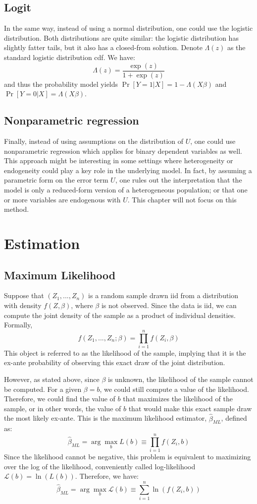 \documentclass[12pt]{report}
\newcommand{\Prob}[1]{\operatorname{Pr}\left[#1\right]}
\begin{document}
\subsection{Logit}

In the same way, instead of using a normal distribution, one could use the logistic distribution. Both distributions are quite similar: the logistic distribution has slightly fatter tails, but it also has a closed-from solution. Denote $\Lambda(z)$ as the standard logistic distribution cdf. We have: $$\Lambda(z) = \frac{\exp(z)}{1 + \exp(z)}$$ and thus the probability model yields $\Prob{Y = 1\vert X} = 1 - \Lambda(X\beta)$ and $\Prob{Y = 0\vert X} = \Lambda(X\beta)$.

\subsection{Nonparametric regression}

Finally, instead of using assumptions on the distribution of $U$, one could use nonparametric regression which applies for binary dependent variables as well. This approach might be interesting in some settings where heterogeneity or endogeneity could play a key role in the underlying model. In fact, by assuming a parametric form on the error term $U$, one rules out the interpretation that the model is only a reduced-form version of a heterogeneous population; or that one or more variables are endogenous with $U$. This chapter will not focus on this method.

\section{Estimation}

\subsection{Maximum Likelihood}

Suppose that $(Z_1,...,Z_n)$ is a random sample drawn iid from a distribution with density $f(Z,\beta)$, where $\beta$ is not observed. Since the data is iid, we can compute the joint density of the sample as a product of individual densities. Formally, $$f(Z_1, ..., Z_n; \beta) = \prod_{i=1}^n f(Z_i,\beta)$$ This object is referred to as the likelihood of the sample, implying that it is the ex-ante probability of observing this exact draw of the joint distribution.

However, as stated above, since $\beta$ is unknown, the likelihood of the sample cannot be computed. For a given $\beta = b$, we could still compute a value of the likelihood. Therefore, we could find the value of $b$ that maximizes the likelihood of the sample, or in other words, the value of $b$ that would make this exact sample draw the most likely ex-ante. This is the maximum likelihood estimator, $\hat\beta_{ML}$, defined as: $$\hat\beta_{ML} = \arg\max_{b} L(b)\equiv \prod_{i=1}^n f(Z_i,b) $$ Since the likelihood cannot be negative, this problem is equivalent to maximizing over the log of the likelihood, conveniently called log-likelihood $\mathcal{L}(b) = \ln(L(b))$. Therefore, we have:$$ \hat\beta_{ML} = \arg\max_{b} \mathcal{L}(b) \equiv \sum_{i=1}^n \ln\left(f(Z_i, b)\right) $$
\end{document}
